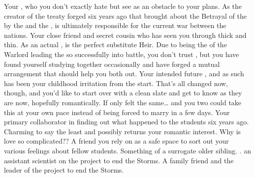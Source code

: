 \documentclass[char]{GL2020}
\begin{document}
\begin{contacts}
    \contact{\cDiplomat{}} Your \cDiplomat{\auncle}, who you don’t exactly hate but see as an obstacle to your plans. As the creator of the treaty forged six years ago that brought about the Betrayal of the \pShip{} by the \pTech{} and the \pFarm{}, \cDiplomat{} is ultimately responsible for the current war between the nations.
    \contact{\cAmbition{}} Your close friend and secret cousin who has seen you through thick and thin. As an actual \cHeir{\formal}, \cAmbition{} is the perfect substitute Heir.
    \contact{\cWarlordDaughter{}} Due to \cWarlordDaughter{} being the \cWarlordDaughter{\offspring} of the Warlord leading the \pShippies{} so successfully into battle, you don’t trust \cWarlordDaughter{\them}, but you have found yourself studying together occasionally and have forged a mutual arrangement that should help you both out. 
    \contact{\cChupStudent{}} Your intended future \cChupStudent{\spouse}, and as such has been your childhood irritation from the start. That's all changed now, though, and you'd like to start over with a clean slate and get to know \cChupStudent{\them} as they are now, hopefully romantically. If only \cChupStudent{\they} felt the same\ldots{} and you two could take this at your own pace instead of being forced to marry in a few days.
    \contact{\cPresident{}} Your primary collaborator in finding out what happened to the students six years ago. Charming to say the least and possibly returns your romantic interest. Why is love so complicated??
    \contact{\cAssistantScientist{}} A friend you rely on as a safe space to sort out your various feelings about fellow students. Something of a surrogate older sibling. . \cAssistantScientist{\They} \cAssistantScientist{\are} an assistant scientist on the project to end the Storms.
    \contact{\cHeadScientist{}} A family friend and the leader of the project to end the Storms.
\end{contacts}
\end{document}
